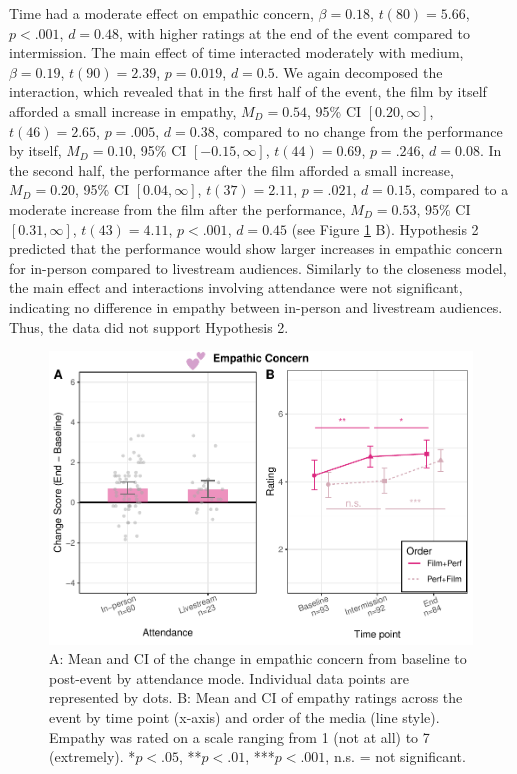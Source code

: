 \documentclass[
  man,floatsintext]{apa6}
\begin{document}
Time had a moderate effect on empathic concern, \(\beta = 0.18\), \(t (80) = 5.66\), \(p < .001\), \(d = 0.48\), with higher ratings at the end of the event compared to intermission. The main effect of time interacted moderately with medium, \(\beta = 0.19\), \(t (90) = 2.39\), \(p = 0.019\), \(d = 0.5\). We again decomposed the interaction, which revealed that in the first half of the event, the film by itself afforded a small increase in empathy, \(M_D = 0.54\), 95\% CI \([0.20, \infty]\), \(t(46) = 2.65\), \(p = .005\), \(d = 0.38\), compared to no change from the performance by itself, \(M_D = 0.10\), 95\% CI \([-0.15, \infty]\), \(t(44) = 0.69\), \(p = .246\), \(d = 0.08\). In the second half, the performance after the film afforded a small increase, \(M_D = 0.20\), 95\% CI \([0.04, \infty]\), \(t(37) = 2.11\), \(p = .021\), \(d = 0.15\), compared to a moderate increase from the film after the performance, \(M_D = 0.53\), 95\% CI \([0.31, \infty]\), \(t(43) = 4.11\), \(p < .001\), \(d = 0.45\) (see Figure \ref{fig:empathy-plots} B). Hypothesis 2 predicted that the performance would show larger increases in empathic concern for in-person compared to livestream audiences. Similarly to the closeness model, the main effect and interactions involving attendance were not significant, indicating no difference in empathy between in-person and livestream audiences. Thus, the data did not support Hypothesis 2.



\begin{figure}
\includegraphics[width=1\linewidth]{Schlichting_MSc_Thesis_files/figure-latex/empathy-plots-1} \caption{A: Mean and CI of the change in empathic concern from baseline to post-event by attendance mode. Individual data points are represented by dots. B: Mean and CI of empathy ratings across the event by time point (x-axis) and order of the media (line style). Empathy was rated on a scale ranging from 1 (not at all) to 7 (extremely). *\(p < .05\), **\(p < .01\), ***\(p < .001\), n.s. = not significant.}\label{fig:empathy-plots}
\end{figure}
\end{document}
